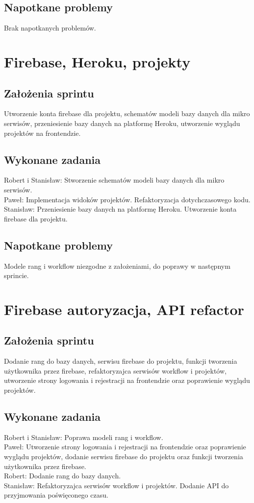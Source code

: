 \documentclass[a4paper,11pt]{report}
\begin{document}
\subsection {Napotkane problemy}
Brak napotkanych problemów.

\section {Firebase, Heroku, projekty}
\label{sec:system_zarzadzania_projektami_uzytkownikow}
\subsection {Założenia sprintu}
Utworzenie konta firebase dla projektu, schematów modeli bazy danych dla mikro serwisów, przeniesienie bazy danych na platformę Heroku, utworzenie wyglądu projektów na frontendzie.
\subsection {Wykonane zadania}
Robert i Stanisław: Stworzenie schematów modeli bazy danych dla mikro serwisów.\\
Paweł: Implementacja widoków projektów. Refaktoryzacja dotychczasowego kodu. \\
Stanisław: Przeniesienie bazy danych na platformę Heroku. Utworzenie konta firebase dla projektu.\\
\subsection {Napotkane problemy}
Modele rang i workflow niezgodne z założeniami, do poprawy w następnym sprincie.

\section {Firebase autoryzacja, API refactor}
\subsection {Założenia sprintu}
Dodanie rang do bazy danych, serwisu firebase do projektu, funkcji tworzenia użytkownika przez firebase, refaktoryzajca serwisów workflow i projektów, utworzenie strony logowania i rejestracji na frontendzie oraz poprawienie wyglądu projektów.
\subsection {Wykonane zadania}
Robert i Stanisław: Poprawa modeli rang i workflow.\\
Paweł: Utworzenie strony logowania i rejestracji na frontendzie oraz poprawienie wyglądu projektów, dodanie serwisu firebase do projektu oraz funkcji tworzenia użytkownika przez firebase.\\
Robert: Dodanie rang do bazy danych.\\
Stanisław: Refaktoryzajca serwisów workflow i projektów. Dodanie API do przyjmowania poświęconego czasu.\\
\end{document}
